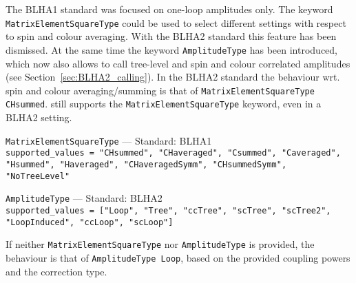 The BLHA1 standard was focused on one-loop amplitudes only. The keyword \texttt{MatrixElementSquareType} could be used to select different settings with respect to spin and colour averaging. With the BLHA2 standard this feature has been dismissed. At the same time the keyword \texttt{AmplitudeType} has been introduced, which now also allows to call tree-level and spin and colour correlated amplitudes (see Section~\ref{sec:BLHA2_calling}). In the BLHA2 standard the behaviour wrt. spin and colour averaging/summing is that of \texttt{MatrixElementSquareType CHsummed}. \gosam still supports the \texttt{MatrixElementSquareType} keyword, even in a BLHA2 setting.
\begin{basedescript}{\desclabelstyle{\pushlabel}}
    \item[\hspace{-1em}]\colorbox{gray!30}{\lstinline[style=in]|MatrixElementSquareType|} --- Standard: BLHA1\vspace{0.1cm}\\
        \lstinline[style=in]|supported_values = "CHsummed", "CHaveraged", "Csummed", "Caveraged", "Hsummed", "Haveraged", "CHaveragedSymm", "CHsummedSymm", "NoTreeLevel"|
    \item[\hspace{-1em}]\colorbox{gray!30}{\lstinline[style=in]|AmplitudeType|} --- Standard: BLHA2\vspace{0.1cm}\\
        \lstinline[style=in]|supported_values = ["Loop", "Tree", "ccTree", "scTree", "scTree2", "LoopInduced", "ccLoop", "scLoop"]|
\end{basedescript}
If neither \texttt{MatrixElementSquareType} nor \texttt{AmplitudeType} is provided, the behaviour is that of \lstinline[style=in]|AmplitudeType Loop|, based on the provided coupling powers and the correction type.\\

